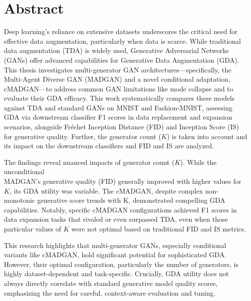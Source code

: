 \section*{Abstract}
\pagestyle{empty}
Deep learning's reliance on extensive datasets underscores the critical need for effective data augmentation, particularly when data is scarce. While traditional data augmentation (TDA) is widely used, Generative Adversarial Networks (GANs) offer advanced capabilities for Generative Data Augmentation (GDA). This thesis investigates multi-generator GAN architectures—specifically, the Multi-Agent Diverse GAN (MADGAN) and a novel conditional adaptation, cMADGAN—to address common GAN limitations like mode collapse and to evaluate their GDA efficacy. This work systematically compares these models against TDA and standard GANs on MNIST and Fashion-MNIST, assessing GDA via downstream classifier F1 scores in data replacement and expansion scenarios, alongside Fréchet Inception Distance (FID) and Inception Score (IS) for generative quality. Further, the generator count (\(K\)) is taken into account and its impact on the downstream classifiers and FID and IS are analyzed.

The findings reveal nuanced impacts of generator count (\(K\)). While the unconditional \\MADGAN's generative quality (FID) generally improved with higher values for \(K\), its GDA utility was variable. The cMADGAN, despite complex non-monotonic generative score trends with K, demonstrated compelling GDA capabilities. Notably, specific cMADGAN configurations achieved F1 scores in data expansion tasks that rivaled or even surpassed TDA, even when those particular values of \(K\) were not optimal based on traditional FID and IS metrics.

This research highlights that multi-generator GANs, especially conditional variants like cMADGAN, hold significant potential for sophisticated GDA. However, their optimal configuration, particularly the number of generators, is highly dataset-dependent and task-specific. Crucially, GDA utility does not always directly correlate with standard generative model quality scores, emphasizing the need for careful, context-aware evaluation and tuning.
